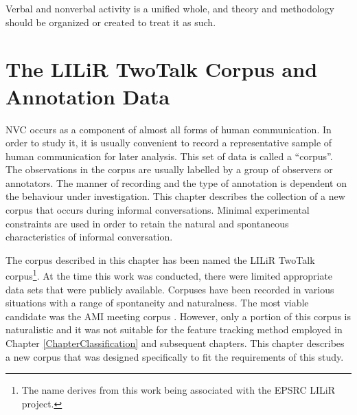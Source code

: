 
\begin{savequote}
Verbal and nonverbal activity is a unified whole, and theory and methodology should be organized or created to treat it as such.
\end{savequote}

\chapter[The LILiR TwoTalk Corpus and Annotation Data]{The LILiR TwoTalk Corpus and Annotation Data}
\label{ChapterCorpus}





\ac{NVC} occurs as a component of almost all forms of human communication. In order to study it, it is usually convenient to record a representative sample of human communication for later analysis. This set of data is called a ``corpus''. The observations in the corpus are usually labelled by a group of observers or annotators. 
The manner of recording and the type of annotation is dependent on the behaviour under investigation. This chapter describes the collection of a new corpus that occurs during informal conversations. Minimal experimental constraints are used in order to retain the natural and spontaneous characteristics of informal conversation. %

The corpus described in this chapter has been named the LILiR TwoTalk corpus\footnote{The name derives from this work being associated with the EPSRC LILiR project.}. 
At the time this work was conducted, there were limited appropriate data sets that were publicly available. Corpuses have been recorded in various situations with a range of spontaneity and naturalness. The most viable candidate was the AMI meeting corpus \cite{Carletta2007}. However, only a portion of this corpus is naturalistic and it was not suitable for the feature tracking method employed in Chapter \ref{ChapterClassification} and subsequent chapters. This chapter describes a new corpus that was designed specifically to fit the requirements of this study.

